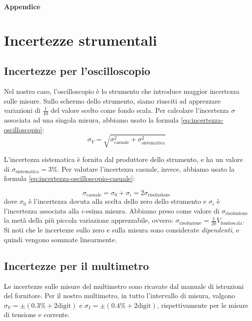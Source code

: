 \appendix
  \textbf{\huge{Appendice}}
    \section{Incertezze strumentali}\label{sec:incertezze-strumentali}
      \subsection{Incertezze per l'oscilloscopio}\label{subsec:incertezze-oscilloscopio}
      Nel nostro caso, l'oscilloscopio è lo strumento che introduce maggior incertezza sulle misure. Sullo schermo dello strumento,
      siamo riusciti ad apprezzare variazioni di $\frac 1 {10}$ del valore scelto come fondo scala. Per calcolare l'incertezza $\sigma$ associata
      ad una singola misura, abbiamo usato la formula \eqref{eq:incertezza-oscilloscopio}:
      \begin{equation}
        \sigma_V = \sqrt{
          \sigma_\text{casuale}^2 + \sigma_\text{sistematica}^2
        }
        \label{eq:incertezza-oscilloscopio}
      \end{equation}

      L'incertezza sistematica è fornita dal produttore dello strumento, e ha un valore di $\sigma_\text{sistematica}=3\%$.
      Per valutare l'incertezza casuale, invece, abbiamo usato la formula \eqref{eq:incertezza-oscilloscopio-casuale}:

      \begin{equation}
        \sigma_\text{casuale} = \sigma_0 + \sigma_i = 2\sigma_\text{risoluzione}
        \label{eq:incertezza-oscilloscopio-casuale}
      \end{equation}
      dove $\sigma_0$ è l'incertezza dovuta alla scelta dello zero dello strumento e
      $\sigma_i$ è l'incertezza associata alla $i$-esima misura. Abbiamo preso come valore di $\sigma_\text{risoluzione}$ la metà
      della più piccola variazione apprezzabile, ovvero: $\sigma_\text{risoluzione} = \frac 1 {20} V_\text{fondoscala}$. Si noti che le
      incertezze sullo zero e sulla misura sono considerate \emph{dipendenti}, e quindi vengono sommate linearmente.

      \subsection{Incertezze per il multimetro}\label{subsec:incertezze-multimetro}
      Le incertezze sulle misure del multimetro sono ricavate dal manuale di istruzioni del fornitore. Per il nostro multimetro,
      in tutto l'intervallo di misura, valgono $\sigma_V = \pm (0.3\% + 2\text{digit})$ e $\sigma_I = \pm (0.4\% + 2\text{digit})$, rispettivamente per le misure di tensione e corrente.


